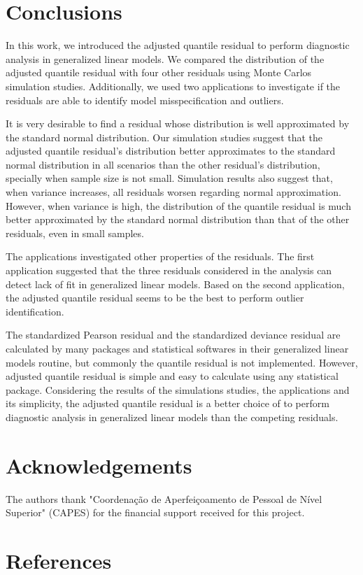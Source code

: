 \documentclass[11pt,authoryear,review,3p,times]{elsarticle}
\begin{document}
\section{Conclusions}\label{conc}

In this work, we introduced the adjusted quantile residual to perform diagnostic analysis in generalized linear models. We compared the distribution of the adjusted quantile residual with four other residuals using Monte Carlos simulation studies. Additionally, we used two applications to investigate if the residuals are able to identify model misspecification and outliers.

It is very desirable to find a residual whose distribution is well approximated by the standard normal distribution.
Our simulation studies suggest that the adjusted quantile residual's distribution better approximates to the standard normal distribution in all scenarios than the other residual's distribution, specially when sample size is not small. Simulation results also suggest that, when variance increases, all residuals worsen regarding normal approximation. However, when variance is high, the distribution of the quantile residual is much better
approximated by the standard normal distribution than that of the other residuals, even in small samples. 

The applications investigated other properties of the residuals.
The first application suggested that the three residuals considered in the analysis can detect lack of fit in generalized linear models.
Based on the second application, the adjusted quantile residual seems to be the best to perform outlier identification.

The standardized Pearson residual and the standardized deviance residual are calculated by many packages and statistical softwares in their generalized linear models routine, but commonly the quantile residual is not implemented. However, adjusted quantile residual is simple and easy to calculate using any statistical package. Considering the results of the simulations studies, the applications and its simplicity, the adjusted quantile residual is a better choice of to perform diagnostic analysis in generalized linear models than the competing residuals.  





  
\section{Acknowledgements}
The authors thank "Coordenação de Aperfeiçoamento de Pessoal de Nível Superior" (CAPES) for the financial support received for this project.


\section{References}




\end{document}
